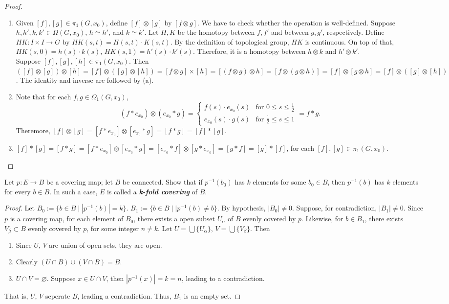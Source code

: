 \documentclass{article}
\begin{document}
\begin{multicols}{2}
\begin{proof}
\begin{enumerate}[label={(\alph*)}]
\item Given $[f],[g]\in \pi_1(G,x_0)$, define $[f]\otimes [g]$ by $[f\otimes g]$. We have to check whether the operation is well-defined. Suppose $h,h',k,k'\in \Omega(G,x_0)$, $h\simeq h'$, and $k\simeq k'$. Let $H,K$ be the homotopy between $f,f'$ and between $g,g'$, respectively. Define $HK:I\times I\to G$ by $HK(s,t) = H(s,t)\cdot K(s,t)$. By the definition of topological group, $HK$ is continuous. On top of that, $HK(s,0) = h(s)\cdot k(s)$, $HK(s,1)= h'(s)\cdot k'(s)$. Therefore, it is a homotopy between $h\otimes k$ and $h'\otimes k'$.\\
Suppose $[f],[g],[h]\in \pi_1(G,x_0)$. Then $([f]\otimes [g])\otimes [h]=[f]\otimes ([g]\otimes [h]) = [f\otimes g] \times [h] = [(f\otimes g) \otimes h]=[f\otimes (g\otimes h)]=[f]\otimes [g\otimes h]=[f]\otimes ([g]\otimes [h])$. The identity and inverse are followed by (a).
\item Note that for each $f,g \in \Omega_1(G,x_0)$, $$(f*e_{x_0})\otimes (e_{x_0}*g) = \begin{cases}
f(s)\cdot e_{x_0}(s) & \text{for } 0\leq s\leq \frac{1}{2}\\
e_{x_0}(s)\cdot g(s) & \text{for } \frac{1}{2}\leq s\leq 1
\end{cases}= f*g.$$
Theremore, $[f]\otimes [g] = [f*e_{x_0}]\otimes [e_{x_0}*g]=[f*g]=[f]*[g]$.
\item $[f]*[g]=[f*g]=[f*e_{x_0}]\otimes [e_{x_0}*g]=[e_{x_0}*f]\otimes [g*e_{x_0}]=[g*f]=[g]*[f]$, for each $[f],[g]\in \pi_1(G,x_0)$.
\end{enumerate}
\end{proof}

\begin{exercise}
Let $p:E\to B$ be a covering map; let $B$ be connected. Show that if $p^{-1}(b_0)$ has $k$ elements for some $b_0\in B$, then $p^{-1}(b)$ has $k$ elements for every $b\in B$. In such a case, $E$ is called a \textbf{\emph{k-fold covering}} of $B$. 
\end{exercise}
\begin{proof}
Let $B_0:=\{b\in B\mid |p^{-1}(b)|=k\}$. $B_1:=\{b\in B\mid |p^{-1}(b)\neq b\}$. By hypothesis, $|B_0|\neq 0$. Suppose, for contradiction, $|B_1| \neq 0$. Since $p$ is a covering map, for each element of $B_0$, there exists a open subset $U_\alpha$ of $B$ evenly covered by $p$. Likewise, for $b\in B_1$, there exists $V_\beta\subset B$ evenly covered by $p$, for some integer $n\neq k$. Let $U= \bigcup \{U_\alpha\}$, $V=\bigcup\{V_\beta\}$. Then
\begin{enumerate}[label={(\alph*)}]
\item Since $U$, $V$ are union of open sets, they are open.
\item Clearly $(U\cap B)\cup (V\cap B)=B$.
\item $U\cap V=\varnothing$. Suppose $x\in U\cap V$, then $|p^{-1}(x)| = k = n$, leading to a contradiction.
\end{enumerate}
That is, $U$, $V$ seperate $B$, leading a contradiction. Thus, $B_1$ is an empty set.
\end{proof}


\end{multicols}
\end{document}
